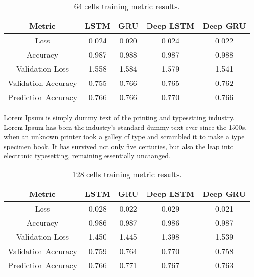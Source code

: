 \documentclass[a4paper,10pt]{article}
\begin{document}
	\begin{table}[ht]
		\centering
		\small
		\begin{tabular}[t]{ | c | c | c | c | c | }
			\hline
			Metric              & LSTM  & GRU   & Deep LSTM & Deep GRU \\ 
			\hline
			Loss                & 0.024 & 0.020 & 0.024     & 0.022 \\ 
			\hline
			Accuracy            & 0.987 & 0.988 & 0.987     & 0.988  \\ 
			\hline
			Validation Loss     & 1.558 & 1.584 & 1.579     & 1.541 \\
			\hline
			Validation Accuracy & 0.755 & 0.766 & 0.765     & 0.762 \\
			\hline
			Prediction Accuracy & 0.766     & 0.766 & 0.770     & 0.766  \\ 
			\hline
		\end{tabular}
		\caption{64 cells training metric results.}
		\label{tab:64_metrics}
	\end{table}%

	Lorem Ipsum is simply dummy text of the printing and typesetting industry. Lorem Ipsum has been the industry's standard dummy text ever since the 1500s, when an unknown printer took a galley of type and scrambled it to make a type specimen book. It has survived not only five centuries, but also the leap into electronic typesetting, remaining essentially unchanged. 



	\begin{table}[ht]
		\centering
		\small
		\begin{tabular}[t]{ | c | c | c | c | c | }
			\hline
			Metric          & LSTM      & GRU   & Deep LSTM & Deep GRU \\ 
			\hline
			Loss            & 0.028     & 0.022 & 0.029     & 0.021 \\ 
			\hline
			Accuracy        & 0.986     & 0.987 & 0.986     & 0.987  \\ 
			\hline
			Validation Loss & 1.450     & 1.445 & 1.398     & 1.539 \\
			\hline
			Validation Accuracy & 0.759 & 0.764 & 0.770     & 0.758 \\
			\hline
			Prediction Accuracy & 0.766     & 0.771 & 0.767     & 0.763 \\
			\hline
		\end{tabular}
		\caption{128 cells training metric results.}
		\label{tab:128_metrics}
	\end{table}%
\end{document}
